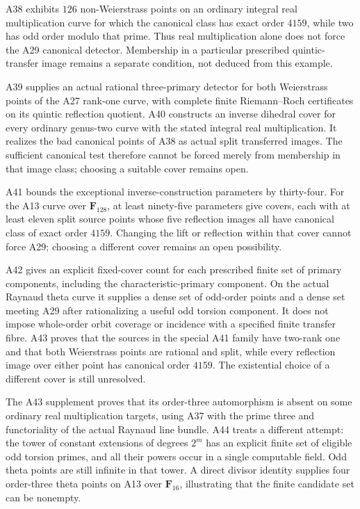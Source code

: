 A38 exhibits $126$ non-Weierstrass points on an ordinary integral
real multiplication curve for which the canonical class has exact
order $4159$, while two has odd order modulo that prime. Thus real
multiplication alone does not force the A29 canonical detector.
Membership in a particular prescribed quintic-transfer image remains
a separate condition, not deduced from this example.

A39 supplies an actual rational three-primary detector for both
Weierstrass points of the A27 rank-one curve, with complete finite
Riemann--Roch certificates on its quintic reflection quotient.
A40 constructs an inverse dihedral cover for every ordinary genus-two
curve with the stated integral real multiplication. It realizes the
bad canonical points of A38 as actual split transferred images.
The sufficient canonical test therefore cannot be forced merely from
membership in that image class; choosing a suitable cover remains open.

A41 bounds the exceptional inverse-construction parameters by thirty-four.
For the A13 curve over $\mathbf F_{128}$, at least ninety-five parameters
give covers, each with at least eleven split source points whose five
reflection images all have canonical class of exact order $4159$.
Changing the lift or reflection within that cover cannot force A29;
choosing a different cover remains an open possibility.

A42 gives an explicit fixed-cover count for each prescribed finite set
of primary components, including the characteristic-primary component.
On the actual Raynaud theta curve it supplies a dense set of odd-order
points and a dense set meeting A29 after rationalizing a useful odd
torsion component. It does not impose whole-order orbit coverage or
incidence with a specified finite transfer fibre. A43 proves that the
sources in the special A41 family have two-rank one and that both
Weierstrass points are rational and split, while every reflection image
over either point has canonical order $4159$. The existential choice
of a different cover is still unresolved.

The A43 supplement proves that its order-three automorphism is absent
on some ordinary real multiplication targets, using A37 with the prime
three and functoriality of the actual Raynaud line bundle. A44 treats a
different attempt: the tower of constant extensions of degrees $2^m$
has an explicit finite set of eligible odd torsion primes, and all their
powers occur in a single computable field. Odd theta points are still
infinite in that tower. A direct divisor identity supplies four
order-three theta points on A13 over $\mathbf F_{16}$, illustrating
that the finite candidate set can be nonempty.

